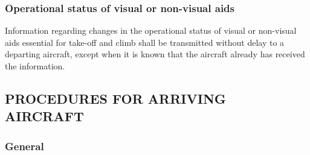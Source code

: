 \documentclass[../vATM.tex]{subfiles}
\begin{document}
    \subsubsection{Operational status of visual or non-visual aids}

    Information regarding changes in the operational status of visual or non-visual aids essential for take-off and climb shall be transmitted without delay to a departing aircraft, except when it is known that the aircraft already has received the information.

    \subsection[Procedures for arriving aircraft]{PROCEDURES FOR ARRIVING AIRCRAFT}

    \subsubsection{General}
\end{document}

